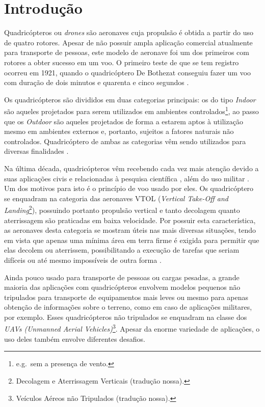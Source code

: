 %
%

\chapter{Introdução}\label{chap:introducao}

Quadricópteros ou \textit{drones} são aeronaves cuja propulsão é obtida a partir do uso de quatro rotores. Apesar de não possuir ampla aplicação comercial atualmente para transporte de pessoas, este modelo de aeronave foi um dos primeiros com rotores a obter sucesso em um voo. O primeiro teste de que se tem registro ocorreu em 1921, quando o quadricóptero De Bothezat conseguiu fazer um voo com duração de dois minutos e quarenta e cinco segundos \cite{Orsag2012}.

Os quadricópteros são divididos em duas categorias principais: os do tipo \textit{Indoor} são aqueles projetados para serem utilizados em ambientes controlados\footnote{e.g.\ sem a presença de vento.}, ao passo que os \textit{Outdoor} são aqueles projetados de forma a estarem aptos à utilização mesmo em ambientes externos e, portanto, sujeitos a fatores naturais não controlados. Quadricóptero de ambas as categorias vêm sendo utilizados para diversas finalidades \cite{Rezazadeh2013}.

Na última década, quadricópteros vêm recebendo cada vez mais atenção devido a suas aplicações civis e relacionadas à pesquisa científica \cite{Al-Younes2008}, além do uso militar \cite{Senkul2013}. Um dos motivos para isto é o princípio de voo usado por eles. Os quadricóptero se enquadram na categoria das aeronaves VTOL (\textit{Vertical Take-Off and Landing}\footnote{Decolagem e Aterrissagem Verticais (tradução nossa).}), possuindo portanto propulsão vertical e tanto decolagem quanto aterrissagem são praticadas em baixa velocidade. Por possuir esta característica, as aeronaves desta categoria se mostram úteis nas mais diversas situações, tendo em vista que apenas uma mínima área em terra firme é exigida para permitir que elas decolem ou aterrissem, possibilitando a execução de tarefas que seriam difíceis ou até mesmo impossíveis de outra forma \cite{Rezazadeh2013}.

Ainda pouco usado para transporte de pessoas ou cargas pesadas, a grande maioria das aplicações com quadricópteros envolvem modelos pequenos não tripulados para transporte de equipamentos mais leves ou mesmo para apenas obtenção de informações sobre o terreno, como em caso de aplicações militares, por exemplo. Esses quadricópteros não tripulados se enquadram na classe dos \textit{UAVs (Unmanned Aerial Vehicles)}\footnote{Veículos Aéreos não Tripulados (tradução nossa).}. Apesar da enorme variedade de aplicações, o uso deles também envolve diferentes desafios.

